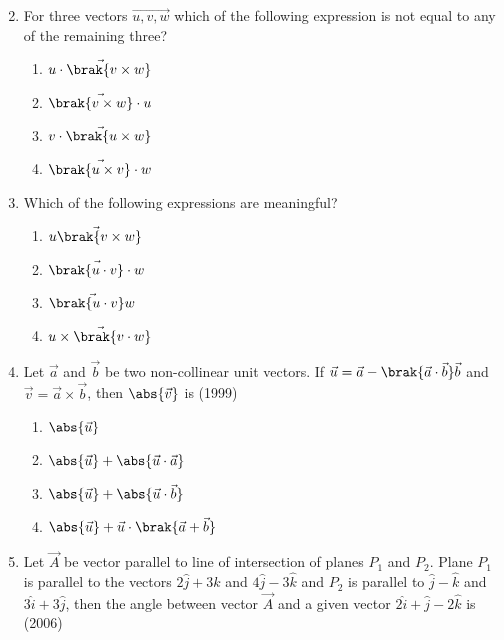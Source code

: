 \begin{enumerate}[label=\thesubsection.\arabic*.,ref=\thesubsection.\theenumi]
\begin{multicols}{2}
\begin{enumerate}
		\end{enumerate} 
  \end{multicols}
\item %
	For three vectors $\vec{u,v,w}$ which of the following expression is not equal to any of the remaining three? \hfill {} 
  \begin{multicols}{2}
		\begin{enumerate}
			\item $\vec{u\cdot\brak{v\times w}}$
			\item $\vec{\brak{v\times w}\cdot u}$
			\item $\vec{v\cdot\brak{u\times w}}$
			\item $\vec{\brak{u\times v}\cdot w}$
		\end{enumerate}
  \end{multicols}
\item %
	Which of the following expressions are meaningful? \hfill {}
  \begin{multicols}{2}
		\begin{enumerate}
			\item $\vec{u\brak{v \times w}}$
			\item $\vec{\brak{u \cdot v}\cdot w}$
			\item $\vec{\brak{u \cdot v}w}$
			\item $\vec{u\times\brak{v \cdot w}}$
		\end{enumerate}
  \end{multicols}
	\item Let $\vec{a}$ and $\vec{b}$ be two non-collinear unit vectors. If $\vec{u}=\vec{a}-\brak{\vec{a}\cdot \vec{b}}\vec{b}$ and $\vec{v}=\vec{a}\times \vec{b}$, then $\abs{\vec{v}}$ is  \hfill (1999)
  \begin{multicols}{2}
		\begin{enumerate}
			\item $\abs{\vec{u}}$
			\item $\abs{\vec{u}} + \abs{\vec{u} \cdot \vec{a}}$
			\item $\abs{\vec{u}} + \abs{\vec{u} \cdot \vec{b}}$
			\item $\abs{\vec{u}} +  \vec{u}\cdot\brak{\vec{a}+\vec{b}}$
		\end{enumerate}
  \end{multicols}
	\item Let $\vec{A}$ be vector parallel to line of intersection of planes $P_1$ and $P_2$. Plane $P_1$ is parallel to the vectors $2\hat{j}+3\hat{k}$ and $4\hat{j}-3\hat{k}$ and $P_2$ is
		parallel to $\hat{j}-\hat{k}$ and $3\hat{i}+3\hat{j}$, then the angle between vector $\vec{A}$ and a given vector $2\hat{i}+\hat{j}-2\hat{k}$ is \hfill{(2006)}

\end{enumerate}
